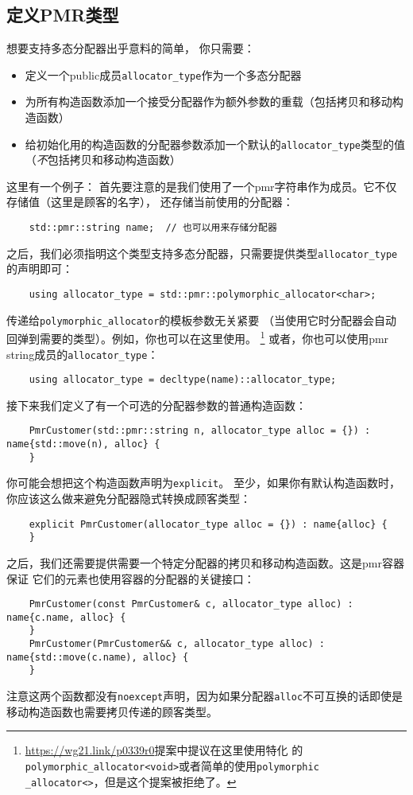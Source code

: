 \subsection{定义PMR类型}\label{ch29.3.1}
想要支持多态分配器出乎意料的简单，
你只需要：
\begin{itemize}
    \item 定义一个public成员\texttt{allocator\_type}作为一个多态分配器
    \item 为所有构造函数添加一个接受分配器作为额外参数的重载（包括拷贝和移动构造函数）
    \item 给初始化用的构造函数的分配器参数添加一个默认的\texttt{allocator\_type}类型的值
    （\emph{不}包括拷贝和移动构造函数）
\end{itemize}
这里有一个例子：
首先要注意的是我们使用了一个pmr字符串作为成员。它不仅存储值（这里是顾客的名字），
还存储当前使用的分配器：
\begin{lstlisting}
    std::pmr::string name;  // 也可以用来存储分配器
\end{lstlisting}
之后，我们必须指明这个类型支持多态分配器，只需要提供类型\texttt{allocator\_type}的声明即可：
\begin{lstlisting}
    using allocator_type = std::pmr::polymorphic_allocator<char>;
\end{lstlisting}
传递给\texttt{polymorphic\_allocator}的模板参数无关紧要
（当使用它时分配器会自动回弹到需要的类型）。例如，你也可以在这里使用。
\footnote{\url{https://wg21.link/p0339r0}提案中提议在这里使用特化
的\texttt{polymorphic\_allocator<void>}或者简单的使用\texttt{polymorphic\\
\_allocator<>}，但是这个提案被拒绝了。}
或者，你也可以使用pmr string成员的\texttt{allocator\_type}：
\begin{lstlisting}
    using allocator_type = decltype(name)::allocator_type;
\end{lstlisting}
接下来我们定义了有一个可选的分配器参数的普通构造函数：
\begin{lstlisting}
    PmrCustomer(std::pmr::string n, allocator_type alloc = {}) : name{std::move(n), alloc} {
    }
\end{lstlisting}
你可能会想把这个构造函数声明为\texttt{explicit}。
至少，如果你有默认构造函数时，你应该这么做来避免分配器隐式转换成顾客类型：
\begin{lstlisting}
    explicit PmrCustomer(allocator_type alloc = {}) : name{alloc} {
    }
\end{lstlisting}
之后，我们还需要提供需要一个特定分配器的拷贝和移动构造函数。这是pmr容器保证
它们的元素也使用容器的分配器的关键接口：
\begin{lstlisting}
    PmrCustomer(const PmrCustomer& c, allocator_type alloc) : name{c.name, alloc} {
    }
    PmrCustomer(PmrCustomer&& c, allocator_type alloc) : name{std::move(c.name), alloc} {
    }
\end{lstlisting}
注意这两个函数都没有\texttt{noexcept}声明，因为如果分配器\texttt{alloc}不可互换的话即使是
移动构造函数也需要拷贝传递的顾客类型。

